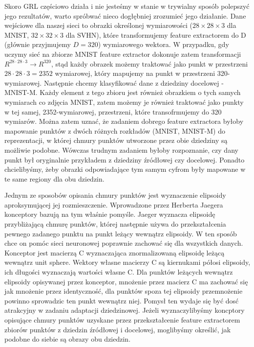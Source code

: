 \documentclass{article}
\begin{document}
Skoro GRL częściowo działa i nie jesteśmy w stanie w trywialny sposób polepszyć jego rezultatów, warto spróbwać nieco dogłębniej zrozumieć jego działanie. Dane wejściowe dla naszej sieci to obrazki określonej wymiarowości ($28 \times 28 \times 3$ dla MNIST, $32 \times 32 \times 3$ dla SVHN), które transformujemy feature extractorem do D (głównie przyjmujemy $D=320$) wymiarowego wektora. W przypadku, gdy uczymy sieć na zbiorze MNIST feature extractor dokonuje zatem transformacji $R^{28 \cdot 28 \cdot 3} \rightarrow R^{320}$, stąd każdy obrazek możemy traktować jako punkt w przestrzeni $28 \cdot 28 \cdot 3 = 2352$ wymiarowej, który mapujemy na punkt w przestrzeni 320-wymiarowej. Następnie chcemy klasyfikować dane z dziedziny docelowej - MNIST-M. Każdy element z tego zbioru jest również obrazkiem o tych samych wymiarach co zdjęcia MNIST, zatem możemy je również traktować jako punkty w tej samej, 2352-wymiarowej, przestrzeni, które transofrmujemy do 320 wymiarów. Można zatem uznać, że zadaniem dobrego feature extractora byłoby mapowanie punktów z dwóch różnych rozkładów (MNIST, MNIST-M) do reprezentacji, w której chmury punktów utworzone przez obie dziedziny są możliwie podobne. Wówczas trudnym zadaniem byłoby rozpoznanie, czy dany punkt był oryginalnie przykładem z dziedziny źródłowej czy docelowej. Ponadto chcielibyśmy, żeby obrazki odpowiadające tym samym cyfrom były mapowane w te same regiony dla obu dziedzin.
\par
Jednym ze sposobów opisania chmury punktów jest wyznaczenie elipsoidy aproksymującej jej rozmieszczenie. Wprowadzone przez Herberta Jaegera konceptory bazują na tym właśnie pomyśle. Jaeger wyznacza elipsoidę przybliżającą chmurę punktów, której następnie używa do przekształcenia pewnego zadanego punktu na punkt leżący wewnątrz elipsoidy. W ten sposób chce on pomóc sieci neuronowej poprawnie zachować się dla wszystkich danych. Konceptor jest macierzą C wyznaczająca znormalizowaną elipsoidę leżącą wewnątrz unit sphere. Wektory własne macierzy C są kiernukami półosi elipsoidy, ich długości wyznaczają wartości własne C. Dla punktów leżących wewnątrz elipsoidy opisywanej przez konceptor, mnożenie przez macierz C ma zachować się jak mnożenie przez identyczność, dla punktów spoza tej elipsoidy przemnożenie powinno sprowadzic ten punkt wewnątrz niej. Pomysł ten wydaje się być dosć atrakcyjny w zadaniu adaptacji dziedzinowej. Jeżeli wyznaczylibyśmy koncptory opisujące chmury punktów uzyskane przez przekształcenie feature extractorem zbiorów punktów z dziedzin źródłowej i docelowej, moglibyśmy określić, jak podobne do siebie są obrazy obu dziedzin. 
\end{document}
